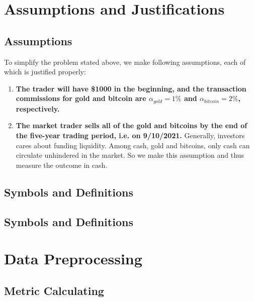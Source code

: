 \documentclass[12pt,a4paper]{article}
\begin{document}
\begin{spacing}{1.2}
\section{Assumptions and Justifications}
\label{Assumptions_Justifications}

\subsection{Assumptions}
To simplify the problem stated above, we make following assumptions, each of which is justified properly: 
\begin{enumerate}
	
	\item \textbf{The trader will have \$1000 in the beginning, and the transaction commissions for gold and bitcoin are $\alpha_{gold}=1\%$ and $\alpha_{bitcoin}=2\%$, respectively.}


	\item \textbf{The market trader sells all of the gold and bitcoins by the end of the five-year trading period, i.e. on 9/10/2021.} Generally, investors cares about funding liquidity. Among cash, gold and bitcoins, only cash can circulate unhindered in the market. So we make this assumption and thus measure the outcome in cash.
	
\end{enumerate}


\subsection{Symbols and Definitions}



\subsection{Symbols and Definitions}







\section{Data Preprocessing}
\label{DataPreprocessing}


\subsection{Metric Calculating}


\end{spacing}
\end{document}
